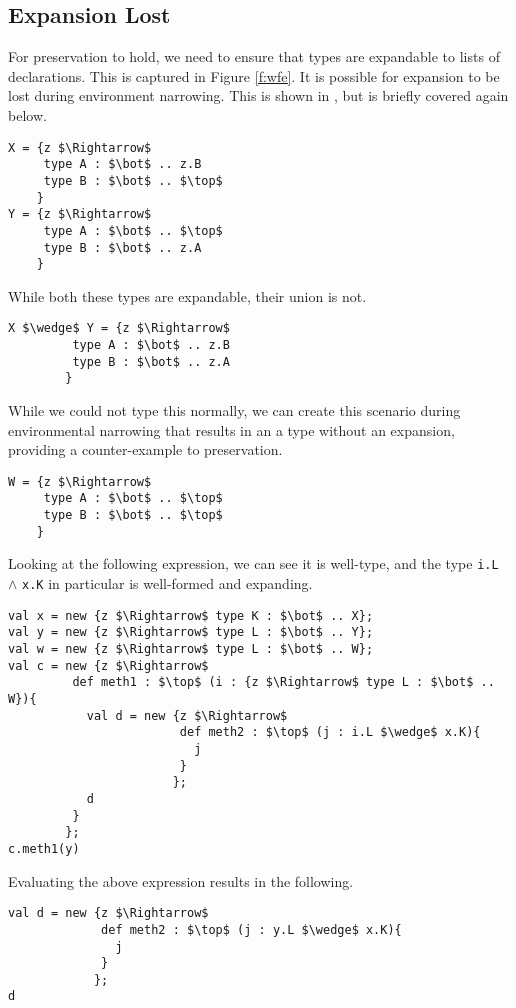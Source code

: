 \documentclass{llncs}
\numberwithin{subcase}{casethm}
\numberwithin{casethm}{theorem}
\numberwithin{casethm}{lemma}
\begin{document}
\subsection{Expansion Lost}
For preservation to hold, we need to ensure that types are expandable 
to lists of declarations. This is captured in Figure \ref{f:wfe}. It is 
possible for expansion to be lost during environment narrowing. This is 
shown in \cite{Amin:2012}, but is briefly covered again below.
\begin{lstlisting}[mathescape, style=custom_lang]
X = {z $\Rightarrow$
     type A : $\bot$ .. z.B
     type B : $\bot$ .. $\top$
    }
Y = {z $\Rightarrow$
     type A : $\bot$ .. $\top$
     type B : $\bot$ .. z.A
    }
\end{lstlisting}
While both these types are expandable, their union is not.
\begin{lstlisting}[mathescape, style=custom_lang]
X $\wedge$ Y = {z $\Rightarrow$
         type A : $\bot$ .. z.B
         type B : $\bot$ .. z.A
        }
\end{lstlisting}
While we could not type this normally, we can create this 
scenario during environmental narrowing that results in 
an a type without an expansion, providing a counter-example 
to preservation.
\begin{lstlisting}[mathescape, style=custom_lang]
W = {z $\Rightarrow$
     type A : $\bot$ .. $\top$
     type B : $\bot$ .. $\top$
    }
\end{lstlisting}
Looking at the following expression, we can see it is well-type, 
and the type \texttt{i.L} $\wedge$ \texttt{x.K} in particular is 
well-formed and expanding.
\begin{lstlisting}[mathescape, style=custom_lang]
val x = new {z $\Rightarrow$ type K : $\bot$ .. X};
val y = new {z $\Rightarrow$ type L : $\bot$ .. Y};
val w = new {z $\Rightarrow$ type L : $\bot$ .. W};
val c = new {z $\Rightarrow$
         def meth1 : $\top$ (i : {z $\Rightarrow$ type L : $\bot$ .. W}){
           val d = new {z $\Rightarrow$
                        def meth2 : $\top$ (j : i.L $\wedge$ x.K){
                          j
                        }
                       };
           d
         }
        };
c.meth1(y)
\end{lstlisting}
Evaluating the above expression results in the following.
\begin{lstlisting}[mathescape, style=custom_lang]
val d = new {z $\Rightarrow$
             def meth2 : $\top$ (j : y.L $\wedge$ x.K){
               j
             }
            };
d
\end{lstlisting}
\end{document}
